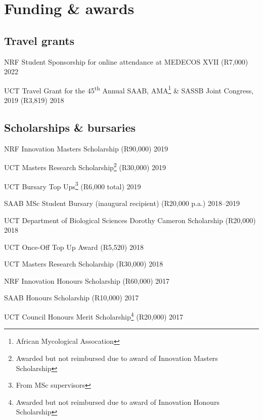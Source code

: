 \documentclass[10pt]{article}
\begin{document}
\vfill

\clearpage %

\section*{Funding \& awards} %

\subsection*{Travel grants}

NRF Student Sponsorship for online attendance at MEDECOS XVII
  (R7,000)                                                           \hfill 2022

UCT Travel Grant for the 45\textsuperscript{th} Annual SAAB,
  AMA\footnote{African Mycological Assocation} \& SASSB Joint
  Congress, 2019 (R3,819)                                            \hfill 2018

\subsection*{Scholarships \& bursaries}

NRF Innovation Masters Scholarship (R90,000)                         \hfill 2019

UCT Masters Research Scholarship\footnote{Awarded but not reimbursed
  due to award of Innovation Masters Scholarship} (R30,000)          \hfill 2019

UCT Bursary Top Ups\footnote{From MSc supervisors} (R6,000 total)    \hfill 2019

SAAB MSc Student Bursary (inaugural recipient) (R20,000 p.a.)  \hfill 2018--2019

UCT Department of Biological Sciences Dorothy Cameron Scholarship
  (R20,000)                                                          \hfill 2018

UCT Once-Off Top Up Award (R5,520)                                   \hfill 2018

UCT Masters Research Scholarship (R30,000)                           \hfill 2018

NRF Innovation Honours Scholarship (R60,000)                         \hfill 2017

SAAB Honours Scholarship (R10,000)                                   \hfill 2017

UCT Council Honours Merit Scholarship\footnote{Awarded but not
  reimbursed due to award of Innovation Honours Scholarship}
  (R20,000)                                                          \hfill 2017
\end{document}
